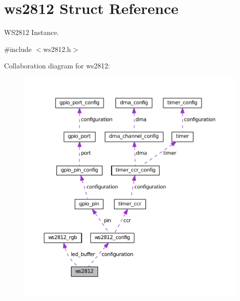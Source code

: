 \hypertarget{structws2812}{}\section{ws2812 Struct Reference}
\label{structws2812}


W\+S2812 Instance.  




{\ttfamily \#include $<$ws2812.\+h$>$}



Collaboration diagram for ws2812\+:
\nopagebreak
\begin{figure}[H]
\begin{center}
\leavevmode
\includegraphics[width=350pt]{structws2812__coll__graph}
\end{center}
\end{figure}
